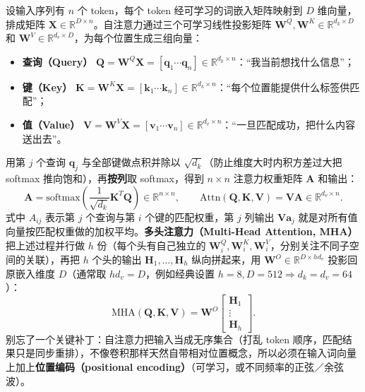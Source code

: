 设输入序列有 $n$ 个 token，每个 token 经可学习的词嵌入矩阵映射到 $D$ 维向量，排成矩阵 $\mathbf{X} \in \mathbb{R}^{D\times n}$。自注意力通过三个可学习线性投影矩阵 $\mathbf{W}^Q, \mathbf{W}^K \in \mathbb{R}^{d_k\times D}$ 和 $\mathbf{W}^V \in \mathbb{R}^{d_v\times D}$，为每个位置生成三组向量：
\begin{itemize}
\item \textbf{查询（Query）} $\mathbf{Q} = \mathbf{W}^Q\mathbf{X} = [\mathbf{q}_1 \cdots \mathbf{q}_n] \in \mathbb{R}^{d_k\times n}$：“我当前想找什么信息”；
\item \textbf{键（Key）} $\mathbf{K} = \mathbf{W}^K\mathbf{X} = [\mathbf{k}_1 \cdots \mathbf{k}_n] \in \mathbb{R}^{d_k\times n}$：“每个位置能提供什么标签供匹配”；
\item \textbf{值（Value）} $\mathbf{V} = \mathbf{W}^V\mathbf{X} = [\mathbf{v}_1 \cdots \mathbf{v}_n] \in \mathbb{R}^{d_v\times n}$：“一旦匹配成功，把什么内容送出去”。
\end{itemize}
用第 $j$ 个查询 $\mathbf{q}_j$ 与全部键做点积并除以 $\sqrt{d_k}$（防止维度大时内积方差过大把 softmax 推向饱和），再\textbf{按列}取 softmax，得到 $n\times n$ 注意力权重矩阵 $\mathbf{A}$ 和输出：
\[
\mathbf{A} = \mathrm{softmax}\!\left(\frac{1}{\sqrt{d_k}}\mathbf{K}^T\mathbf{Q}\right) \in \mathbb{R}^{n\times n},
\qquad
\mathrm{Attn}(\mathbf{Q},\mathbf{K},\mathbf{V}) = \mathbf{V}\mathbf{A} \in \mathbb{R}^{d_v\times n}.
\tag{7.10}
\]
式中 $A_{ij}$ 表示第 $j$ 个查询与第 $i$ 个键的匹配权重，第 $j$ 列输出 $\mathbf{V}\mathbf{a}_j$ 就是对所有值向量按匹配权重做的加权平均。\textbf{多头注意力（Multi-Head Attention, MHA）}把上述过程并行做 $h$ 份（每个头有自己独立的 $\mathbf{W}_i^Q, \mathbf{W}_i^K, \mathbf{W}_i^V$，分别关注不同子空间的关联），再把 $h$ 个头的输出 $\mathbf{H}_1,\dots,\mathbf{H}_h$ 纵向拼起来，用 $\mathbf{W}^O\in\mathbb{R}^{D\times h d_v}$ 投影回原嵌入维度 $D$（通常取 $h d_v = D$，例如经典设置 $h=8, D=512 \Rightarrow d_k = d_v = 64$）：
\[
\mathrm{MHA}(\mathbf{Q},\mathbf{K},\mathbf{V}) = \mathbf{W}^O
\begin{bmatrix}\mathbf{H}_1 \\ \vdots \\ \mathbf{H}_h\end{bmatrix}.
\tag{7.11}
\]
别忘了一个关键补丁：自注意力把输入当成无序集合（打乱 token 顺序，匹配结果只是同步重排），不像卷积那样天然自带相对位置概念，所以必须在输入词向量上加上\textbf{位置编码（positional encoding）}（可学习，或不同频率的正弦／余弦波）。

